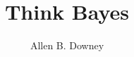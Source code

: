 \documentclass[12pt]{book}
\title{Think Bayes}
\author{Allen B. Downey}
\newif\ifplastex
\begin{document}
\frontmatter


\newcommand{\PMF}{\mathrm{PMF}}
\newcommand{\PDF}{\mathrm{PDF}}
\newcommand{\CDF}{\mathrm{CDF}}
\newcommand{\ICDF}{\mathrm{ICDF}}

\ifplastex
    \usepackage{localdef}
    \maketitle

\newcount\anchorcnt
\newcommand*{\Anchor}[1]{%
  \@bsphack%
    \Hy@GlobalStepCount\anchorcnt%
    \edef\@currentHref{anchor.\the\anchorcnt}%
    \Hy@raisedlink{\hyper@anchorstart{\@currentHref}\hyper@anchorend}%
    \M@gettitle{}\label{#1}%
    \@esphack%
}
\else

  {\topsep}%
  {\topsep}%
  {}%
  {}%
  {\bfseries}%
  {}%
  { }%
  {}%

\theoremstyle{exercise}
\newtheorem{exercise}{Exercise}[chapter]


\end{document}
